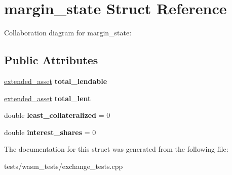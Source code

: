 \hypertarget{structmargin__state}{}\section{margin\+\_\+state Struct Reference}
\label{structmargin__state}


Collaboration diagram for margin\+\_\+state\+:
\subsection*{Public Attributes}
\begin{DoxyCompactItemize}
\item 
\mbox{\label{structmargin__state_a78435a471f947fd5ebebfba889824c9b}} 
\mbox{\hyperlink{structaacio_1_1extended__asset}{extended\+\_\+asset}} {\bfseries total\+\_\+lendable}
\item 
\mbox{\label{structmargin__state_ad9ac0d71035564df3d26c27e0aae598d}} 
\mbox{\hyperlink{structaacio_1_1extended__asset}{extended\+\_\+asset}} {\bfseries total\+\_\+lent}
\item 
\mbox{\label{structmargin__state_ac77d1822751fd208f3a3e5c71febef6b}} 
double {\bfseries least\+\_\+collateralized} = 0
\item 
\mbox{\label{structmargin__state_add27eb6c663390aaa0d884e527ea012e}} 
double {\bfseries interest\+\_\+shares} = 0
\end{DoxyCompactItemize}


The documentation for this struct was generated from the following file\+:\begin{DoxyCompactItemize}
\item 
tests/wasm\+\_\+tests/exchange\+\_\+tests.\+cpp\end{DoxyCompactItemize}

